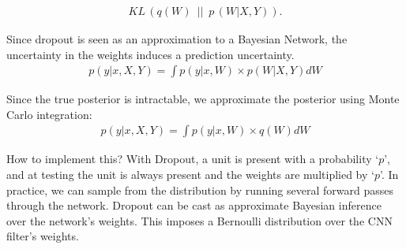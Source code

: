 \begin{gather*} 
    KL \, (q(W) \enspace \vert \vert \enspace p \, (W\vert X,Y)).
\end{gather*}
    
Since dropout is seen as an approximation to a Bayesian Network, the uncertainty in the weights induces a prediction uncertainty.
\begin{gather*} 
    p(y\vert x,X,Y) =  \int p(y\vert x,W) \times p(W \vert X, Y) dW
    \end{gather*}

Since the true posterior is intractable, we approximate the posterior using Monte Carlo integration:
\begin{gather*} 
    p(y\vert x,X,Y) =  \int p(y\vert x,W) \times q(W) dW
    \end{gather*}

How to implement this? With Dropout, a unit is present with a probability `$p$', and at testing the unit is always present and the weights are multiplied by `$p$'. In practice, we can sample from the distribution by running several forward passes through the network.  Dropout can be cast as approximate Bayesian inference over the network’s weights. This imposes a Bernoulli distribution over the CNN filter’s weights.

